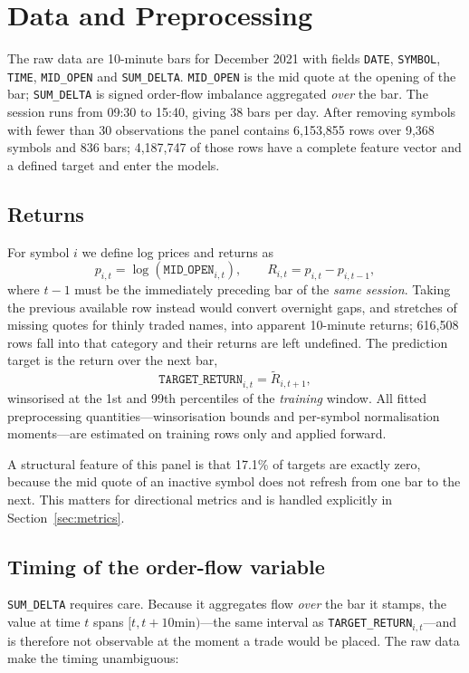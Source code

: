 \documentclass[11pt]{article}
\begin{document}
\section{Data and Preprocessing}

The raw data are 10-minute bars for December 2021 with fields \texttt{DATE},
\texttt{SYMBOL}, \texttt{TIME}, \texttt{MID\_OPEN} and \texttt{SUM\_DELTA}.
\texttt{MID\_OPEN} is the mid quote at the opening of the bar; \texttt{SUM\_DELTA}
is signed order-flow imbalance aggregated \emph{over} the bar. The session runs
from 09:30 to 15:40, giving 38 bars per day. After removing symbols with fewer
than 30 observations the panel contains 6,153,855 rows over 9,368
symbols and 836 bars; 4,187,747 of those rows have a complete feature
vector and a defined target and enter the models.

\subsection{Returns}

For symbol $i$ we define log prices and returns as
\[
p_{i,t} = \log(\texttt{MID\_OPEN}_{i,t}), \qquad
R_{i,t} = p_{i,t} - p_{i,t-1},
\]
where $t-1$ must be the immediately preceding bar of the \emph{same session}.
Taking the previous available row instead would convert overnight gaps, and
stretches of missing quotes for thinly traded names, into apparent 10-minute
returns; 616,508 rows fall into that category and their returns are left
undefined. The prediction target is the return over the next bar,
\[
\texttt{TARGET\_RETURN}_{i,t} = \widetilde R_{i,t+1},
\]
winsorised at the 1st and 99th percentiles of the \emph{training} window. All
fitted preprocessing quantities---winsorisation bounds and per-symbol
normalisation moments---are estimated on training rows only and applied
forward.

A structural feature of this panel is that 17.1\% of targets are exactly
zero, because the mid quote of an inactive symbol does not refresh from one bar
to the next. This matters for directional metrics and is handled explicitly in
Section~\ref{sec:metrics}.

\subsection{Timing of the order-flow variable}
\label{sec:timing}

\texttt{SUM\_DELTA} requires care. Because it aggregates flow \emph{over} the
bar it stamps, the value at time $t$ spans $[t, t+10\text{min})$---the same
interval as \texttt{TARGET\_RETURN}$_{i,t}$---and is therefore not observable at
the moment a trade would be placed. The raw data make the timing unambiguous:
\end{document}
